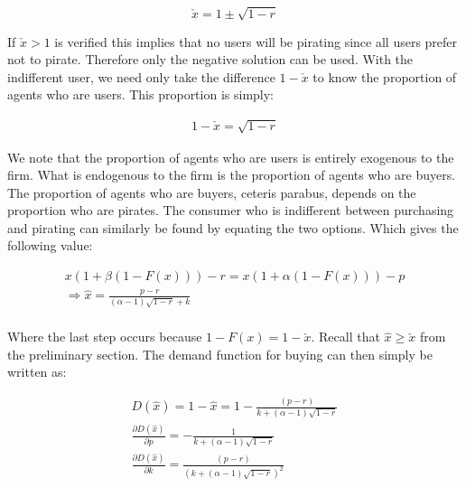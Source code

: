 \begin{equation*}
\check{x} = 1
\pm \sqrt{ 1 -r }
\end{equation*}

If $\check{x}>1$ is verified this implies that no users will be pirating since all users prefer not to pirate. Therefore only the negative solution can be used.  With the indifferent user, we need only take the difference $1-\check{x}$ to know the proportion of agents who are users. This proportion is simply:

\begin{align*}
1-\check{x}=\sqrt{ 1 -r }
\end{align*}

We note that the proportion of agents who are users is entirely exogenous to the firm. What is endogenous to the firm is the proportion of agents who are buyers. The proportion of agents who are buyers, ceteris parabus, depends on the proportion who are pirates. The consumer who is indifferent between purchasing and pirating can similarly be found by equating the two options. Which gives the following value:

\begin{align*}
x(1+\beta(1-F(x)))-r=x(1+\alpha(1-F(x)))-p \\
\Rightarrow \hat{x}=\frac{p-r}{(\alpha-1)\sqrt{ 1 -r }+k} \\
\end{align*}

Where the last step occurs because $1-F(x)=1-\check{x}$. Recall that $\hat{x} \geq \check{x}$ from the preliminary section. The demand function for buying can then simply be written as:

\begin{align*}
D(\hat{x})=1-\hat{x}=1-\frac{ (p-r)}{k + (\alpha-1) \sqrt{ 1 -r }} \\
\frac{\partial D(\hat{x})}{\partial p} =
-\frac{ 1}{k + (\alpha-1) \sqrt{ 1 -r }} \\
\frac{\partial D(\hat{x})}{\partial k} =
\frac{ (p-r) }{(k+
 (\alpha-1)\sqrt{ 1 - r }
)^2} 
\end{align*}


